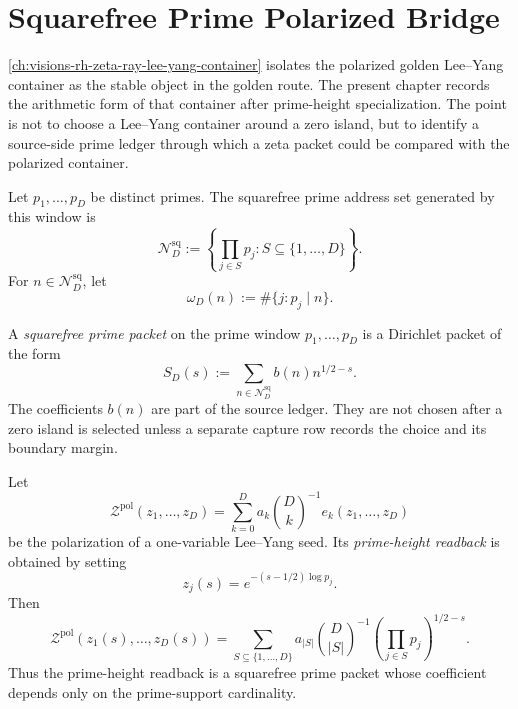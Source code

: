 \chapter{Squarefree Prime Polarized Bridge}
\label{ch:visions-rh-squarefree-prime-polarized-bridge}

\autoref{ch:visions-rh-zeta-ray-lee-yang-container} isolates the
polarized golden Lee--Yang container as the stable object in the golden
route.  The present chapter records the arithmetic form of that
container after prime-height specialization.  The point is not to choose
a Lee--Yang container around a zero island, but to identify a
source-side prime ledger through which a zeta packet could be compared
with the polarized container.

\begin{definition}
\label{def:rh-squarefree-prime-address-set}
Let $p_1,\ldots,p_D$ be distinct primes.  The squarefree prime address
set generated by this window is
$$
\mathcal N_D^{\mathrm{sq}}
:=
\left\{
\prod_{j\in S}p_j
:
S\subseteq \{1,\ldots,D\}
\right\}.
$$
For $n\in\mathcal N_D^{\mathrm{sq}}$, let
$$
\omega_D(n)
:=
\#\{j:p_j\mid n\}.
$$
\end{definition}

\begin{definition}
\label{def:rh-squarefree-prime-packet}
A \emph{squarefree prime packet} on the prime window
$p_1,\ldots,p_D$ is a Dirichlet packet of the form
$$
S_D(s)
:=
\sum_{n\in\mathcal N_D^{\mathrm{sq}}}
b(n)n^{1/2-s}.
$$
The coefficients $b(n)$ are part of the source ledger.  They are not
chosen after a zero island is selected unless a separate capture row
records the choice and its boundary margin.
\end{definition}

\begin{definition}
\label{def:rh-prime-height-polarized-readback}
Let
$$
\mathcal Z^{\mathrm{pol}}(z_1,\ldots,z_D)
=
\sum_{k=0}^{D}
a_k\binom{D}{k}^{-1}
e_k(z_1,\ldots,z_D)
$$
be the polarization of a one-variable Lee--Yang seed.  Its
\emph{prime-height readback} is obtained by setting
$$
z_j(s)=e^{-(s-1/2)\log p_j}.
$$
Then
$$
\mathcal Z^{\mathrm{pol}}(z_1(s),\ldots,z_D(s))
=
\sum_{S\subseteq\{1,\ldots,D\}}
a_{|S|}\binom{D}{|S|}^{-1}
\left(\prod_{j\in S}p_j\right)^{1/2-s}.
$$
Thus the prime-height readback is a squarefree prime packet whose
coefficient depends only on the prime-support cardinality.
\end{definition}

